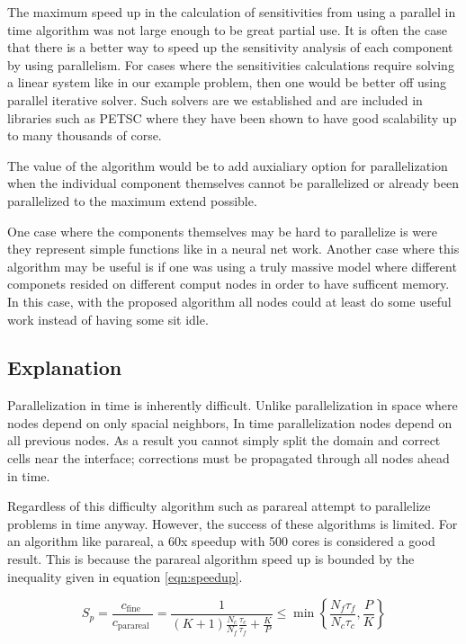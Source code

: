 \documentclass[conf]{new-aiaa}
\begin{document}
The maximum speed up in the calculation of sensitivities from using a parallel in time algorithm was not large enough to be great partial use.
It is often the case that there is a better way to speed up the sensitivity analysis of each component by using parallelism.
For cases where the sensitivities calculations require solving a linear system like in our example problem, then one would be better off using parallel iterative solver.
Such solvers are we established and are included in libraries such as PETSC where they have been shown to have good scalability up to many thousands of corse.

The value of the algorithm would be to add auxialiary option for parallelization when the individual component themselves cannot be parallelized or already been parallelized to the maximum extend possible.

One case where the components themselves may be hard to parallelize is were they represent simple functions like in a neural net work.
Another case where this algorithm may be useful is if one was using a truly massive model where different componets resided on different comput nodes in order to have sufficent memory.
In this case, with the proposed algorithm all nodes could at least do some useful work instead of having some sit idle.

\subsection{Explanation}



Parallelization in time is inherently difficult.
Unlike parallelization in space where nodes depend on only spacial neighbors, In time parallelization nodes depend on all previous nodes.
As a result you cannot simply split the domain and correct cells near the interface; corrections must be propagated through all nodes ahead in time.


Regardless of this difficulty algorithm such as parareal attempt to parallelize problems in time anyway.
However, the success of these algorithms is limited.
For an algorithm like parareal, a 60x speedup with 500 cores is considered a good result.
This is because the parareal algorithm speed up is bounded by the inequality given in equation \ref{eqn:speedup}.


\begin{equation}
    S_{p}=\frac{c_{\text {fine }}}{c_{\text {parareal }}}=\frac{1}{(K+1) \frac{N_{c}}{N_{f}} \frac{\tau_{c}}{\tau_{f}}+\frac{K}{P}} \leq \min \left\{\frac{N_{f} \tau_{f}}{N_{c} \tau_{c}}, \frac{P}{K}\right\}
    \label{eqn:speedup}
\end{equation}
\end{document}
